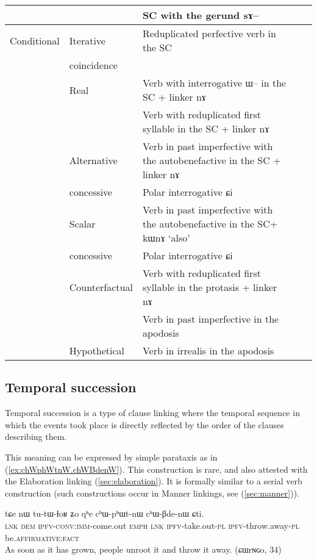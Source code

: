 \documentclass[oldfontcommands,oneside,a4paper,11pt]{article}
\newcommand{\ipa}[1]{{\phon \mbox{#1}}} %
\newcommand{\refb}[1]{(\ref{#1})}
\begin{document}
\begin{table}[h]
{\begin{tabular}{lllll}
      &&SC with the \textbf{gerund} \ipa{sɤ--} \\
\midrule
Conditional &Iterative& Reduplicated perfective verb in the SC\\
&coincidence\\
&Real& Verb with interrogative \ipa{ɯ--} in the SC + linker \ipa{nɤ} \\
& & Verb with reduplicated first syllable in the SC + linker \ipa{nɤ} \\
& Alternative   & Verb in past  imperfective with the autobenefactive in the SC + linker \ipa{nɤ}\\
& concessive& Polar interrogative \ipa{ɕi} \\
& Scalar   & Verb in past  imperfective with the autobenefactive  in the SC+  \ipa{kɯnɤ} `also'\\
& concessive& Polar interrogative \ipa{ɕi} \\
& Counterfactual& Verb with reduplicated first syllable in the protasis + linker \ipa{nɤ} \\
&  & Verb in past imperfective in the apodosis   \\
& Hypothetical &  Verb in irrealis in the apodosis   \\
\bottomrule
\end{tabular}}
\end{table}
\subsection{Temporal succession}  \label{sec:temporal.succession}



Temporal succession is a type of clause linking where the temporal sequence in which the events  took place is directly reflected by the order of the clauses describing them.   

This meaning can be expressed by simple parataxis as in \refb{ex:chWphWtnW.chWBdenW}. This construction is rare, and also attested with the Elaboration linking \refb{sec:elaboration}. It is formally similar to a serial verb construction (such constructions occur in Manner linkings, see \refb{sec:manner}).
\begin{exe}
\ex \label{ex:chWphWtnW.chWBdenW}
\gll 
\ipa{tɕe}  	\ipa{nɯ}  	\ipa{tu-tɯ-ɬoʁ}  	\ipa{ʑo}  	\ipa{qʰe}  	\ipa{cʰɯ-pʰɯt-nɯ}  	\ipa{cʰɯ-βde-nɯ}  	\ipa{ɕti.}  \\
\textsc{lnk} \textsc{dem} \textsc{ipfv-conv:imm}-come.out \textsc{emph} \textsc{lnk} \textsc{ipfv}-take.out-\textsc{pl} \textsc{ipfv}-throw.away-\textsc{pl}  be.\textsc{affirmative}:\textsc{fact} \\
\glt As soon as it has grown, people unroot it and throw it away. (\ipa{ɕɯrɴɢo}, 34)
\end{exe}
\end{document}
